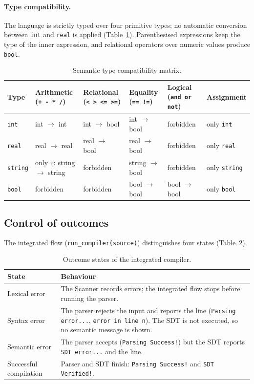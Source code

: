 \documentclass[11pt,a4paper]{article}
\newcommand{\tk}[1]{\texttt{#1}}
\begin{document}
\paragraph{Type compatibility.} The language is strictly typed over four primitive types; no automatic conversion between \texttt{int} and \texttt{real} is applied (Table~\ref{tab:typematrix}). Parenthesised expressions keep the type of the inner expression, and relational operators over numeric values produce \texttt{bool}.

\begin{table}[H]
\centering
\small
\begin{tabularx}{\textwidth}{@{}lXXXXX@{}}
\toprule
\textbf{Type} & \textbf{Arithmetic} (\tk{+ - * /}) & \textbf{Relational} (\tk{< > <= >=}) & \textbf{Equality} (\tk{== !=}) & \textbf{Logical} (\tk{and or not}) & \textbf{Assignment}\\
\midrule
\texttt{int} & int $\to$ int & int $\to$ bool & int $\to$ bool & forbidden & only \texttt{int}\\
\texttt{real} & real $\to$ real & real $\to$ bool & real $\to$ bool & forbidden & only \texttt{real}\\
\texttt{string} & only \tk{+}: string $\to$ string & forbidden & string $\to$ bool & forbidden & only \texttt{string}\\
\texttt{bool} & forbidden & forbidden & bool $\to$ bool & bool $\to$ bool & only \texttt{bool}\\
\bottomrule
\end{tabularx}
\caption{Semantic type compatibility matrix.}
\label{tab:typematrix}
\end{table}

\subsection{Control of outcomes}
The integrated flow (\texttt{run\_compiler(source)}) distinguishes four states (Table~\ref{tab:states}).

\begin{table}[H]
\centering
\small
\begin{tabularx}{\textwidth}{@{}lX@{}}
\toprule
\textbf{State} & \textbf{Behaviour}\\
\midrule
Lexical error & The Scanner records errors; the integrated flow stops before running the parser.\\
Syntax error & The parser rejects the input and reports the line (\texttt{Parsing error...}, \texttt{error in line n}). The SDT is not executed, so no semantic message is shown.\\
Semantic error & The parser accepts (\texttt{Parsing Success!}) but the SDT reports \texttt{SDT error...} and the line.\\
Successful compilation & Parser and SDT finish: \texttt{Parsing Success!} and \texttt{SDT Verified!}.\\
\bottomrule
\end{tabularx}
\caption{Outcome states of the integrated compiler.}
\label{tab:states}
\end{table}
\end{document}
